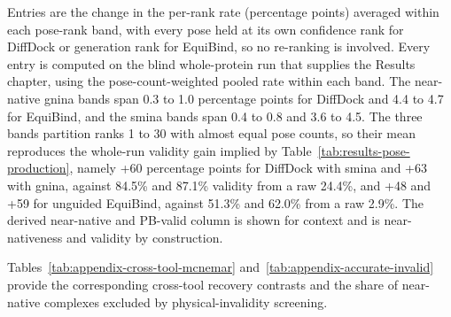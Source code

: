\begin{longtable}[]
{Entries are the change in the per-rank rate (percentage points) averaged within each pose-rank band, with every pose held at its own confidence rank for DiffDock or generation rank for EquiBind, so no re-ranking is involved. Every entry is computed on the blind whole-protein run that supplies the Results chapter, using the pose-count-weighted pooled rate within each band. The near-native gnina bands span 0.3 to 1.0 percentage points for DiffDock and 4.4 to 4.7 for EquiBind, and the smina bands span 0.4 to 0.8 and 3.6 to 4.5. The three bands partition ranks 1 to 30 with almost equal pose counts, so their mean reproduces the whole-run validity gain implied by Table~\ref{tab:results-pose-production}, namely +60 percentage points for DiffDock with smina and +63 with gnina, against 84.5\% and 87.1\% validity from a raw 24.4\%, and +48 and +59 for unguided EquiBind, against 51.3\% and 62.0\% from a raw 2.9\%. The derived near-native and PB-valid column is shown for context and is near-nativeness and validity by construction.} \\
\end{longtable}
\endgroup

Tables~\ref{tab:appendix-cross-tool-mcnemar} and~\ref{tab:appendix-accurate-invalid} provide the corresponding cross-tool recovery contrasts and the share of near-native complexes excluded by physical-invalidity screening.

